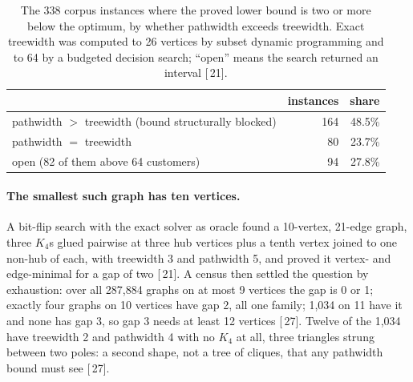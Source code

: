 \documentclass[11pt,a4paper]{article}
\renewcommand{\S}[1]{[\textsection\,#1]}
\begin{document}
\begin{table}[t]
\centering
\small
\caption{The 338 corpus instances where the proved lower bound is two or more
below the optimum, by whether pathwidth exceeds treewidth. Exact treewidth was
computed to 26 vertices by subset dynamic programming and to 64 by a budgeted
decision search; ``open'' means the search returned an interval \S{21}.}
\label{tab:gap}
\begin{tabular}{lrr}
\toprule
 & instances & share \\
\midrule
pathwidth $>$ treewidth (bound structurally blocked) & 164 & 48.5\% \\
pathwidth $=$ treewidth & 80 & 23.7\% \\
open (82 of them above 64 customers) & 94 & 27.8\% \\
\bottomrule
\end{tabular}
\end{table}

\paragraph{The smallest such graph has ten vertices.}
A bit-flip search with the exact solver as oracle found a 10-vertex, 21-edge
graph, three $K_4$s glued pairwise at three hub vertices plus a tenth vertex
joined to one non-hub of each, with treewidth 3 and pathwidth 5, and proved it
vertex- and edge-minimal for a gap of two \S{21}. A census then settled the
question by exhaustion: over all 287,884 graphs on at most 9 vertices the
gap is 0 or 1; exactly four graphs on 10 vertices have gap 2, all one family;
1,034 on 11 have it and none has gap 3, so gap 3 needs at least 12 vertices
\S{27}. Twelve of the 1,034 have treewidth 2 and pathwidth 4 with no $K_4$
at all, three triangles strung between two poles: a second shape, not a tree
of cliques, that any pathwidth bound must see \S{27}.
\end{document}
